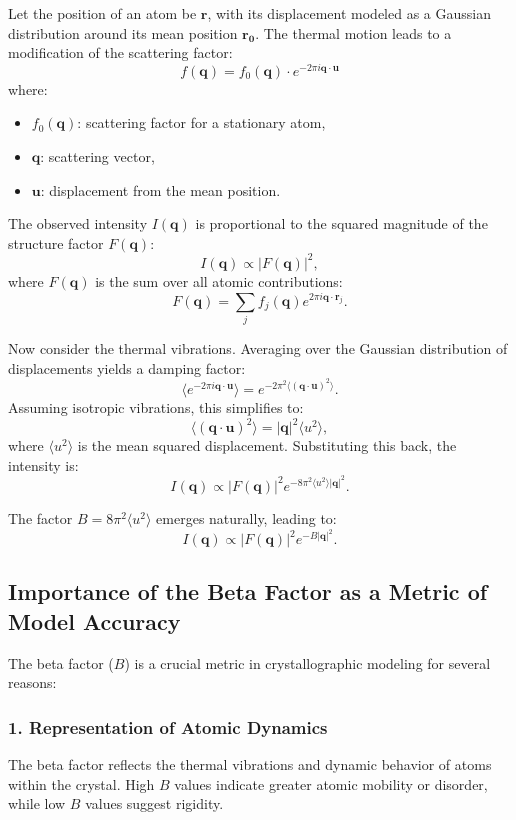 \documentclass[English, Lau, oneside]{sapthesis}
\begin{document}
\begin{itemize}
Let the position of an atom be $\mathbf{r}$, with its displacement modeled as a Gaussian distribution around its mean position $\mathbf{r_0}$. The thermal motion leads to a modification of the scattering factor:
\[
f(\mathbf{q}) = f_0(\mathbf{q}) \cdot e^{-2\pi i \mathbf{q} \cdot \mathbf{u}}
\]
where:
\begin{itemize}
    \item $f_0(\mathbf{q})$: scattering factor for a stationary atom,
    \item $\mathbf{q}$: scattering vector,
    \item $\mathbf{u}$: displacement from the mean position.
\end{itemize}

The observed intensity $I(\mathbf{q})$ is proportional to the squared magnitude of the structure factor $F(\mathbf{q})$:
\[
I(\mathbf{q}) \propto |F(\mathbf{q})|^2,
\]
where $F(\mathbf{q})$ is the sum over all atomic contributions:
\[
F(\mathbf{q}) = \sum_j f_j(\mathbf{q}) e^{2\pi i \mathbf{q} \cdot \mathbf{r}_j}.
\]

Now consider the thermal vibrations. Averaging over the Gaussian distribution of displacements yields a damping factor:
\[
\langle e^{-2\pi i \mathbf{q} \cdot \mathbf{u}} \rangle = e^{-2\pi^2 \langle (\mathbf{q} \cdot \mathbf{u})^2 \rangle}.
\]
Assuming isotropic vibrations, this simplifies to:
\[
\langle (\mathbf{q} \cdot \mathbf{u})^2 \rangle = |\mathbf{q}|^2 \langle u^2 \rangle,
\]
where $\langle u^2 \rangle$ is the mean squared displacement. Substituting this back, the intensity is:
\[
I(\mathbf{q}) \propto |F(\mathbf{q})|^2 e^{-8\pi^2 \langle u^2 \rangle |\mathbf{q}|^2}.
\]

The factor $B = 8\pi^2 \langle u^2 \rangle$ emerges naturally, leading to:
\[
I(\mathbf{q}) \propto |F(\mathbf{q})|^2 e^{-B |\mathbf{q}|^2}.
\]

\subsection*{Importance of the Beta Factor as a Metric of Model Accuracy}
The beta factor ($B$) is a crucial metric in crystallographic modeling for several reasons:

\subsubsection*{1. Representation of Atomic Dynamics}
The beta factor reflects the thermal vibrations and dynamic behavior of atoms within the crystal. High $B$ values indicate greater atomic mobility or disorder, while low $B$ values suggest rigidity.


\end{itemize}
\end{document}
